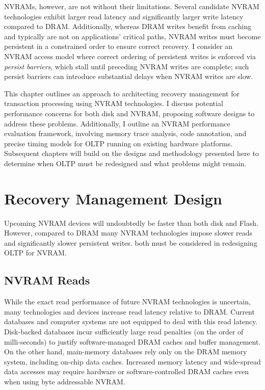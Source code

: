 NVRAMs, however, are not without their limitations.
Se\-veral candidate NVRAM technologies exhibit larger read latency and significantly larger write latency compared to DRAM.
Additionally, whereas DRAM writes benefit from caching and typically are not on applications' critical paths, NVRAM writes must become persistent in a constrained order to ensure correct recovery.
I consider an NVRAM access model where correct ordering of persistent writes is enforced via \emph{persist barriers}, which stall until preceding NVRAM writes are complete; such persist barriers can introduce substantial delays when NVRAM writes are slow.

This chapter outlines an approach to architecting recovery management for transaction processing using NVRAM technologies.
I discuss potential performance concerns for both disk and NVRAM, proposing software designs to address these problems.
Additionally, I outline an NVRAM performance evaluation framework, involving memory trace analysis, code annotation, and precise timing models for OLTP running on existing hardware platforms.
Subsequent chapters will build on the designs and methodology presented here to determine when OLTP must be redesigned and what problems might remain.

\section{Recovery Management Design}
\label{sec:OLTP_design:Design}



Upcoming NVRAM devices will undoubtedly be faster than both disk and Flash.
However, compared to DRAM many NVRAM technologies impose slower reads and significantly slower persistent writes.
both must be considered in redesigning OLTP for NVRAM.

\subsection{NVRAM Reads}
\label{sect:OLTP_design:Design:Reads}
While the exact read performance of future NVRAM technologies is uncertain, many technologies and devices increase read latency relative to DRAM.
Current databases and computer systems are not equipped to deal with this read latency.
Disk-backed databases incur sufficiently large read penalties (on the order of milli-seconds) to justify software-managed DRAM caches and buffer management.
On the other hand, main-memory databases rely only on the DRAM memory system, including on-chip data caches.
Increased memory latency and wide-spread data accesses may require hardware or software-controlled DRAM caches even when using byte addressable NVRAM.


